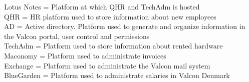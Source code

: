 Lotus Notes		=	Platform at which QHR and TechAdm is hosted	\\
QHR				=	HR platform used to store information about new employees	\\
AD				=	Active directory. Platform used to generate and organize information in the Valcon portal, user control and permissions	\\
TechAdm			=	Platform used to store information about rented hardware	\\
Maconomy		=	Platform used to administrate invoices	\\
Exchange		=	Platform used to administrate the Valcon mail system	\\
BlueGarden		=	Platform used to administrate salaries in Valcon Denmark	\\
